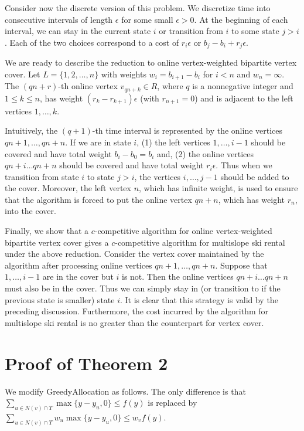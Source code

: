 \documentclass{article}
\begin{document}
Consider now the discrete version of this problem. We discretize time into consecutive intervals of length $\epsilon$ for some small $\epsilon >0$. At the beginning of each interval, we can stay in the current state $i$ or transition from $i$ to some state $j>i$. Each of the two choices correspond to a cost of $r_i\epsilon$ or $b_j-b_i+r_j\epsilon$.



We are ready to describe the reduction to online vertex-weighted bipartite vertex cover. Let $L=\{1,2,\ldots,n\}$ with weights $w_i=b_{i+1}-b_i$ for $i<n$ and $w_n=\infty$. The $(qn+r)$-th online vertex $v_{qn+k}\in R$, where $q$ is a nonnegative integer and $1\leq k\leq n$, has weight $(r_{k}-r_{k+1})\epsilon$ (with $r_{n+1}=0$) and is adjacent to the left vertices $1,\ldots,k$.

Intuitively, the $(q+1)$-th time interval is represented by the online vertices $qn+1,\ldots,qn+n$. If we are in state $i$, (1) the left vertices $1,\ldots,i-1$ should be covered and have total weight $b_i-b_0=b_i$ and, (2) the online vertices $qn+i\ldots qn+n$ should be covered and have total weight $r_i\epsilon$. Thus when we transition from state $i$ to state $j>i$, the vertices $i,\ldots,j-1$ should be added to the cover. Moreover, the left vertex $n$, which has infinite weight, is used to ensure that the algorithm is forced to put the online vertex $qn+n$, which has weight $r_n$, into the cover.

Finally, we show that a $c$-competitive algorithm for online vertex-weighted bipartite vertex cover gives a $c$-competitive algorithm for multislope ski rental under the above reduction. Consider the vertex cover maintained by the algorithm after processing online vertices $qn+1,\ldots,qn+n$. Suppose that $1,\ldots,i-1$ are in the cover but $i$ is not. Then the online vertices  $qn+i\ldots qn+n$ must also be in the cover. Thus we can simply stay in (or transition to if the previous state is smaller) state $i$. It is clear that this strategy is valid by the preceding discussion. Furthermore, the cost incurred by the algorithm for multislope ski rental is no greater than the counterpart for vertex cover.

\section{Proof of Theorem 2}
We modify GreedyAllocation as follows. The only difference is that $\sum_{u\in N(v)\cap T} \max\{y-y_u,0\} \leq f(y)$ is replaced by $\sum_{u\in N(v)\cap T} w_u\max\{y-y_u,0\} \leq w_vf(y)$.
\end{document}

